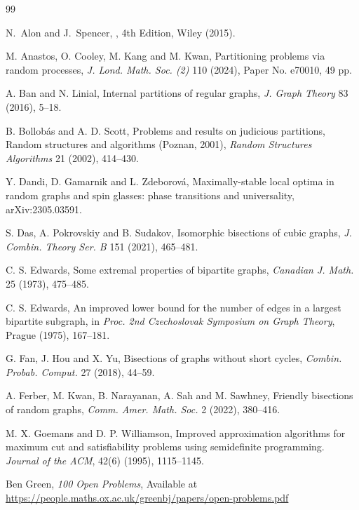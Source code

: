 \documentclass{aic}
\begin{document}
	\begin{thebibliography}{99}
		
		N.~Alon and J.~Spencer,
		, 4th Edition, Wiley (2015).
		
		
		M. Anastos, O. Cooley, M. Kang and M. Kwan,
		Partitioning problems via random processes,
		\emph{J. Lond. Math. Soc. (2)} 110 (2024), Paper No. e70010, 49 pp.
		
		A. Ban and N. Linial,
		Internal partitions of regular graphs,
		\emph{J. Graph Theory} 83 (2016), 5--18.
		
		
		B. Bollob\'as and A. D. Scott,
		Problems and results on judicious partitions, Random structures and algorithms (Poznan, 2001),
		\emph{Random Structures Algorithms} 21 (2002), 414--430.
		
		
		
		Y. Dandi, D. Gamarnik and L. Zdeborov\'a,
		Maximally-stable local optima in random graphs and spin glasses: phase transitions and universality, arXiv:2305.03591.
		
		
		
		S. Das, A. Pokrovskiy and B. Sudakov,
		Isomorphic bisections of cubic graphs,
		\emph{J. Combin. Theory Ser. B} 151 (2021), 465--481.
		
		
		
		C. S. Edwards, Some extremal properties of bipartite graphs,
		\emph{Canadian J. Math.} 25 (1973), 475--485.
		
		C. S. Edwards, An improved lower bound for the number of edges in a largest bipartite subgraph, in
		\emph{Proc. 2nd Czechoslovak Symposium on Graph Theory}, Prague (1975), 167--181.
		
		
		G. Fan, J. Hou and X. Yu,
		Bisections of graphs without short cycles,
		\emph{Combin. Probab. Comput.} 27 (2018), 44--59.
		
		A. Ferber, M. Kwan, B. Narayanan, A. Sah and M. Sawhney,
		Friendly bisections of random graphs,
		\emph{Comm. Amer. Math. Soc.} 2 (2022), 380--416.
		
		M. X. Goemans and D. P. Williamson,
		Improved approximation algorithms for maximum cut and satisfiability problems using semidefinite programming.
		\emph{Journal of the ACM}, 42(6) (1995), 1115--1145.
		
		
		Ben Green,
		\emph{100 Open Problems},
		Available at \url{https://people.maths.ox.ac.uk/greenbj/papers/open-problems.pdf}
		

\end{thebibliography}
\end{document}

